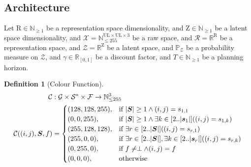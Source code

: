 \documentclass{amsart}
\theoremstyle{definition}
\newtheorem{definition}{Definition}
\theoremstyle{remark}
\newcommand{\N}{\mathbb{N}}
\newcommand{\R}{\mathbb{R}}
\begin{document}

\subsection{Architecture}

Let $\mathrm{R}\in\N_{\geq 1}$ be a representation space dimensionality,
and $\mathrm{Z}\in\N_{\geq 1}$ be a latent space dimensionality,
and $\mathcal{X}=\N_{\leq 255}^{\mathrm{U}\mathrm{L}\times\mathrm{U}\mathrm{L}\times 3}$ be a raw space,
and $\mathcal{R}=\R^{\mathrm{R}}$ be a representation space,
and $\mathcal{Z}=\R^{\mathrm{Z}}$ be a latent space,
and $\mathbb{P}_{\mathcal{Z}}$ be a probability measure on $\mathcal{Z}$,
and $\gamma\in\R_{[0,1]}$ be a discount factor,
and $T\in\N_{\geq 1}$ be a planning horizon.

\begin{definition}[Colour Function]
\begin{align*}
	\mathcal{C}
	&:
	\mathcal{G}
	\times
	\mathcal{S}^{*}
	\times
	\mathcal{F}
	\to
	\N_{\leq 255}^{3}
	\\
	\mathcal{C}((i,j),\bm{S},f)
	&=
	\begin{cases}
		(128,128,255) %
		, &
		\text{if }
		\abs{\bm{S}}\geq 1\land(i,j)=s_{1,1}
		\\
		(0,0,255) %
		, &
		\text{if }
		\abs{\bm{S}}\geq 1
		\land
		\exists k\in\mleft[2..\abs{\bm{s}_{1}}\mright]\mleft(
			(i,j)=s_{1,k}
		\mright)
		\\
		(255,128,128) %
		, &
		\text{if }
		\exists r\in\mleft[2..\abs{\bm{S}}\mright]\mleft(
			(i,j)=s_{r,1}
		\mright)
		\\
		(255,0,0) %
		, &
		\text{if }
		\exists r\in\mleft[2..\abs{\bm{S}}\mright],
		\exists k\in[2..\abs{\bm{s}_{r}}]\mleft(
			(i,j)=s_{r,k}
		\mright)
		\\
		(0,255,0) %
		, &
		\text{if }
		f\neq\perp\land(i,j)=f
		\\
		(0,0,0) %
		, &
		\text{otherwise}
	\end{cases}
\end{align*}
\end{definition}
\end{document}
